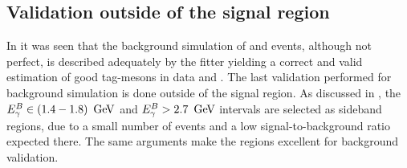 \subsection{Validation outside of the \texorpdfstring{\EB}{EB} signal region}\label{sec:sidebands_validation}

In  it was seen that the background simulation of \qqbar and \BB events,
although not perfect, is described adequately by the \Mbc fitter yielding a correct and valid estimation of good tag-\B mesons in data and \MC.
The last validation performed for background simulation is done outside of the \EB signal region.
As discussed in , the ${E^B_{\gamma}}\in(1.4-1.8)~\mathrm{\,Ge\kern -0.1em V}$ and ${E^B_{\gamma}}>2.7~\mathrm{\,Ge\kern -0.1em V}$ intervals are selected as sideband regions, 
due to a small number of \BtoXsgamma events and a low signal-to-background ratio expected there.
The same arguments make the regions excellent for background validation.

